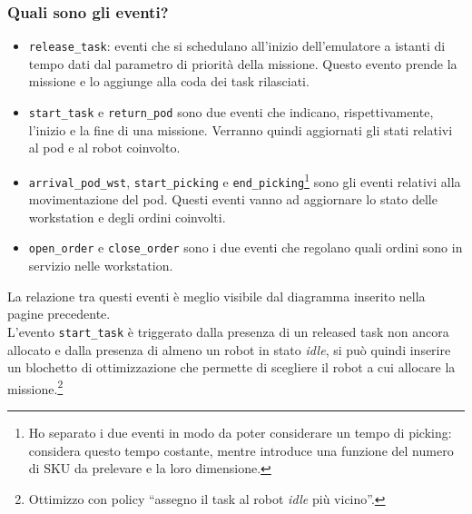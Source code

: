 \documentclass{article}
\begin{document}
\subsubsection{Quali sono gli \textbf{eventi}?}
\begin{itemize}
    \item \texttt{release\_task}: eventi che si schedulano all'inizio dell'emulatore a istanti di tempo dati dal parametro di priorità della missione. Questo evento prende la missione e lo aggiunge alla coda dei task rilasciati.
    \item \texttt{start\_task} e \texttt{return\_pod} sono due eventi che indicano, rispettivamente, l'inizio e la fine di una missione. Verranno quindi aggiornati gli stati relativi al pod e al robot coinvolto.
    \item \texttt{arrival\_pod\_wst}, \texttt{start\_picking} e \texttt{end\_picking}\footnote{Ho separato i due eventi in modo da poter considerare un tempo di picking:\cite{BOYSEN2017550} considera questo tempo costante, mentre \cite{DeKoster2023} introduce una funzione del numero di SKU da prelevare e la loro dimensione.} sono gli eventi relativi alla movimentazione del pod. Questi eventi vanno ad aggiornare lo stato delle workstation e degli ordini coinvolti. 
    \item \texttt{open\_order} e \texttt{close\_order} sono i due eventi che regolano quali ordini sono in servizio nelle workstation.
\end{itemize}

La relazione tra questi eventi è meglio visibile dal diagramma inserito nella pagine precedente.  \\
L'evento \texttt{start\_task} è triggerato dalla presenza di un released task non ancora allocato e dalla presenza di almeno un robot in stato \emph{idle}, si può quindi inserire un blochetto di ottimizzazione che permette di scegliere il robot a cui allocare la missione.\footnote{Ottimizzo con policy \enquote{assegno il task al robot \emph{idle} più vicino}.}
\end{document}
